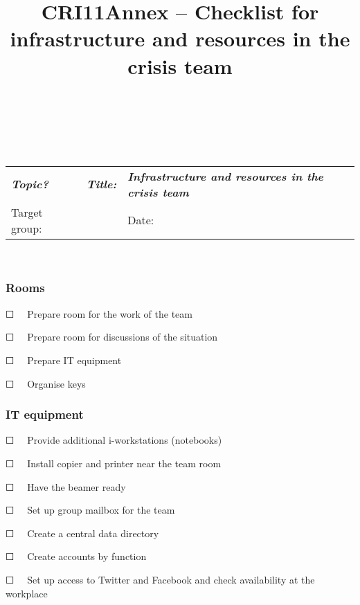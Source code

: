 \documentclass{article}
\begin{document}
\title{CRI11Annex – Checklist for infrastructure and resources in the crisis team}

\maketitle





 


 


\begin{tabu} to \textwidth { |X|X|X| }
\hline



\emph{\textbf{Topic?}} & \emph{\textbf{Title:}} & \emph{\textbf{Infrastructure and resources in the crisis team}}
 \\


Target group:  &  & Date:
 \\
\hline

\end{tabu}

                                                         


\subsubsection{Rooms}\label{H4260866}



☐   Prepare room for the work of the team


☐   Prepare room for discussions of the situation


☐   Prepare IT equipment


☐   Organise keys


\subsubsection{IT equipment}\label{H5650686}



☐   Provide additional i-workstations (notebooks)


☐   Install copier and printer near the team room


☐   Have the beamer ready


☐   Set up group mailbox for the team


☐   Create a central data directory


☐   Create accounts by function


☐   Set up access to Twitter and Facebook and check availability at the workplace
\end{document}
